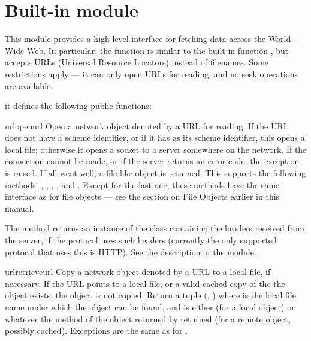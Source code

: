 \section{Built-in module }

This module provides a high-level interface for fetching data across
the World-Wide Web.  In particular, the  function is
similar to the built-in function , but accepts URLs
(Universal Resource Locators) instead of filenames.  Some restrictions
apply --- it can only open URLs for reading, and no seek operations
are available.

it defines the following public functions:

\begin{funcdesc}{urlopen}{url}
Open a network object denoted by a URL for reading.  If the URL does
not have a scheme identifier, or if it has  as its scheme
identifier, this opens a local file; otherwise it opens a socket to a
server somewhere on the network.  If the connection cannot be made, or
if the server returns an error code, the  exception is
raised.  If all went well, a file-like object is returned.  This
supports the following methods: , ,
, ,  and .
Except for the last one, these methods have the same interface as for
file objects --- see the section on File Objects earlier in this
manual.

The  method returns an instance of the class
 containing the headers received from the server,
if the protocol uses such headers (currently the only supported
protocol that uses this is HTTP).  See the description of the
 module.
\end{funcdesc}

\begin{funcdesc}{urlretrieve}{url}
Copy a network object denoted by a URL to a local file, if necessary.
If the URL points to a local file, or a valid cached copy of the the
object exists, the object is not copied.  Return a tuple (,
) where  is the local file name under which
the object can be found, and  is either  (for
a local object) or whatever the  method of the object
returned by  returned (for a remote object, possibly
cached).  Exceptions are the same as for .
\end{funcdesc}

